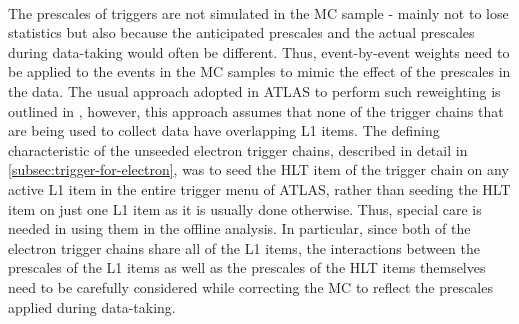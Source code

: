 \\
The prescales of triggers are not simulated in the MC sample - mainly not to lose statistics but also because the anticipated prescales and the actual prescales during data-taking would often be different. %
Thus, event-by-event weights need to be applied to the events in the MC samples to mimic the effect of the prescales in the data. %
The usual approach adopted in ATLAS to perform such reweighting is outlined in \cite{Buttinger:2014726}, however, this approach assumes that none of the trigger chains that are being used to collect data have overlapping L1 items. %
The defining characteristic of the unseeded electron trigger chains, described in detail in \ref{subsec:trigger-for-electron}, was to seed the HLT item of the trigger chain on any active L1 item in the entire trigger menu of ATLAS, rather than seeding the HLT item on just one L1 item as it is usually done otherwise. %
Thus, special care is needed in using them in the offline analysis. %
In particular, since both of the electron trigger chains share all of the L1 items, the interactions between the prescales of the L1 items as well as the prescales of the HLT items themselves need to be carefully considered while correcting the MC to reflect the prescales applied during data-taking.%
